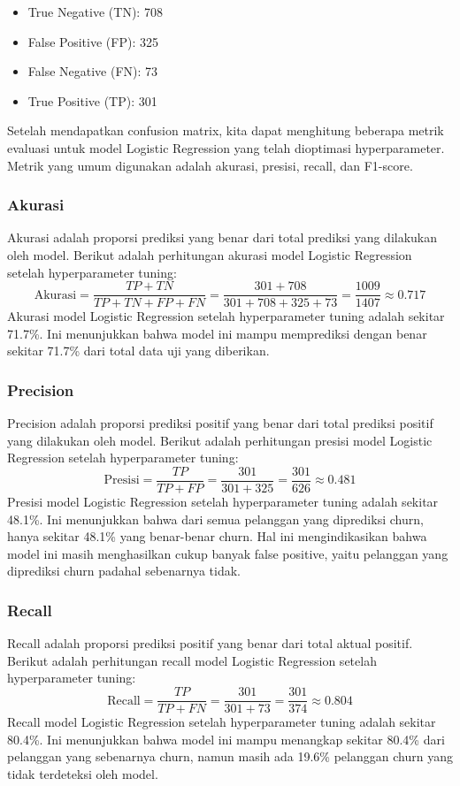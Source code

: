 \begin{itemize}
    \item True Negative (TN): 708
    \item False Positive (FP): 325
    \item False Negative (FN): 73
    \item True Positive (TP): 301
\end{itemize}

Setelah mendapatkan confusion matrix, kita dapat menghitung beberapa metrik evaluasi untuk model Logistic Regression yang telah dioptimasi hyperparameter. Metrik yang umum digunakan adalah akurasi, presisi, recall, dan F1-score.

\subsubsection*{Akurasi}
Akurasi adalah proporsi prediksi yang benar dari total prediksi yang dilakukan oleh model. Berikut adalah perhitungan akurasi model Logistic Regression setelah hyperparameter tuning:
\begin{equation}
    \text{Akurasi} = \frac{TP + TN}{TP + TN + FP + FN} = \frac{301 + 708}{301 + 708 + 325 + 73} = \frac{1009}{1407} \approx 0.717
\end{equation}
Akurasi model Logistic Regression setelah hyperparameter tuning adalah sekitar 71.7\%. Ini menunjukkan bahwa model ini mampu memprediksi dengan benar sekitar 71.7\% dari total data uji yang diberikan.
\subsubsection*{Precision}
Precision adalah proporsi prediksi positif yang benar dari total prediksi positif yang dilakukan oleh model. Berikut adalah perhitungan presisi model Logistic Regression setelah hyperparameter tuning:
\begin{equation}
    \text{Presisi} = \frac{TP}{TP + FP} = \frac{301}{301 + 325} = \frac{301}{626} \approx 0.481
\end{equation}
Presisi model Logistic Regression setelah hyperparameter tuning adalah sekitar 48.1\%. Ini menunjukkan bahwa dari semua pelanggan yang diprediksi churn, hanya sekitar 48.1\% yang benar-benar churn. Hal ini mengindikasikan bahwa model ini masih menghasilkan cukup banyak false positive, yaitu pelanggan yang diprediksi churn padahal sebenarnya tidak.
\subsubsection*{Recall}
Recall adalah proporsi prediksi positif yang benar dari total aktual positif. Berikut adalah perhitungan recall model Logistic Regression setelah hyperparameter tuning:
\begin{equation}
    \text{Recall} = \frac{TP}{TP + FN} = \frac{301}{301 + 73} = \frac{301}{374} \approx 0.804
\end{equation}
Recall model Logistic Regression setelah hyperparameter tuning adalah sekitar 80.4\%. Ini menunjukkan bahwa model ini mampu menangkap sekitar 80.4\% dari pelanggan yang sebenarnya churn, namun masih ada 19.6\% pelanggan churn yang tidak terdeteksi oleh model.
